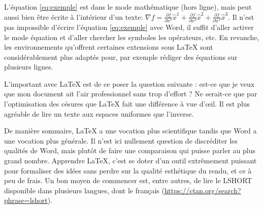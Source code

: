 	L'équation \ref{eq:exemple} est dans le mode mathématique (hors ligne), mais peut aussi bien être écrite à l'intérieur d'un texte:
	\(
	\nabla f =%
	\frac{\partial f}{\partial x^1}\widehat{x}^1%
	+\frac{\partial f}{\partial x^2}\widehat{x}^2%
	+\frac{\partial f}{\partial x^3}\widehat{x}^3
	\).
	Il n'est pas impossible d'écrire l'équation \ref{eq:exemple} avec Word, il suffit d'aller activer le mode équation et d'aller chercher les symboles les opérateurs, etc. En revanche, les environnements qu'offrent certaines extensions sous \LaTeX{} sont considérablement plus adaptés pour, par exemple rédiger des équations sur plusieurs lignes.
	
	 \break\break\break\break\break\break
	 \noindent L'important avec \LaTeX{} est de ce poser la question suivante : est-ce que je veux que mon document ait l'air professionnel sans trop d'effort ? Ne serait-ce que par l'optimisation des césures que \LaTeX{} fait une différence à vue d'\oe il. Il est plus agréable de lire un texte aux espaces uniformes que l'inverse.

	\par De manière sommaire, \LaTeX{} a une vocation plus scientifique tandis que Word a une vocation plus générale. Il n'est ici nullement question de discréditer les qualités de Word, mais plutôt de faire une comparaison qui puisse parler au plus grand nombre. Apprendre \LaTeX, c'est se doter d'un outil extrêmement puissant pour formaliser des idées sans perdre sur la qualité esthétique du rendu, et ce à peu de frais. Un bon moyen de commencer est, entre autres, de lire le LSHORT disponible dans plusieurs langues, dont le français (\url{https://ctan.org/search?phrase=lshort}).
	
